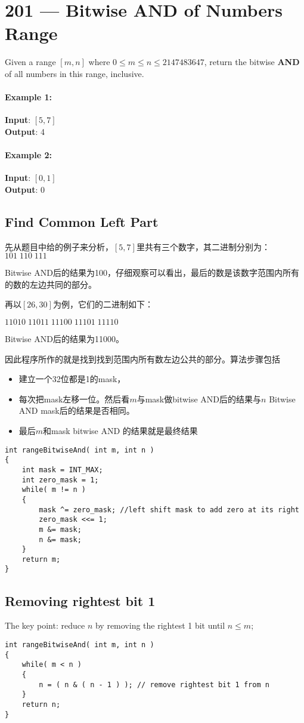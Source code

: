 \section{201 --- Bitwise AND of Numbers Range}
Given a range $[m, n]$ where $0 \leq m \leq n \leq 2147483647$, return the bitwise \textbf{AND} of all numbers in this range, inclusive.
\paragraph{Example 1:}
\begin{flushleft}
\textbf{Input}: $[5,7]$
\\
\textbf{Output}: 4
\end{flushleft}
\paragraph{Example 2:}
\begin{flushleft}
\textbf{Input}: $[0,1]$
\\
\textbf{Output}: 0
\end{flushleft}
\subsection{Find Common Left Part}
先从题目中给的例子来分析，$[5, 7]$里共有三个数字，其二进制分别为：
$101\;110\;111$

Bitwise AND后的结果为100，仔细观察可以看出，最后的数是该数字范围内所有的数的左边共同的部分。

再以$[26, 30]$为例，它们的二进制如下：

$11010\;11011\;11100\;11101\;11110$

Bitwise AND后的结果为11000。

因此程序所作的就是找到找到范围内所有数左边公共的部分。算法步骤包括
\begin{itemize}
\item 建立一个32位都是1的mask，
\item 每次把mask左移一位。然后看$m$与mask做bitwise AND后的结果与$n$ Bitwise AND mask后的结果是否相同。
\item 最后$m$和mask bitwise AND 的结果就是最终结果
\end{itemize}

\setcounter{lstlisting}{0}
\begin{lstlisting}[style=customc, caption={Find Common Left Bits}]
int rangeBitwiseAnd( int m, int n )
{
    int mask = INT_MAX;
    int zero_mask = 1;
    while( m != n )
    {
        mask ^= zero_mask; //left shift mask to add zero at its right
        zero_mask <<= 1;
        m &= mask;
        n &= mask;
    }
    return m;
}
\end{lstlisting}
\subsection{Removing rightest bit 1}
The key point: reduce $n$ by removing the rightest 1 bit until $n\leq m$;
\begin{lstlisting}[style=customc, caption={Remove rightest bit 1}]
int rangeBitwiseAnd( int m, int n )
{
    while( m < n )
    {
        n = ( n & ( n - 1 ) ); // remove rightest bit 1 from n
    }
    return n;
}
\end{lstlisting}